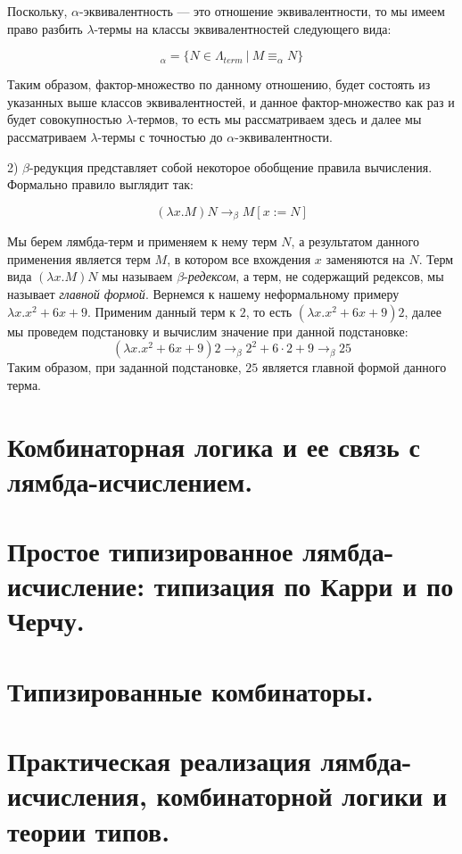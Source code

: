 \documentclass[a4paper]{article}
\begin{document}
Поскольку, $\alpha$-эквивалентность --- это отношение эквивалентности, то мы имеем право разбить $\lambda$-термы на классы эквивалентностей следующего вида:

\begin{equation}
[M]_{\alpha} = \{ N \in \Lambda_{term} \: | \: M \equiv_{\alpha} N \}
\end{equation}

Таким образом, фактор-множество по данному отношению, будет состоять из указанных выше классов эквивалентностей, и данное фактор-множество как
раз и будет совокупностью $\lambda$-термов, то есть мы рассматриваем здесь и далее мы рассматриваем $\lambda$-термы с точностью до $\alpha$-эквивалентности.

2) $\beta$-редукция представляет собой некоторое обобщение правила вычисления. Формально правило выглядит так:

\begin{equation}
(\lambda x. M) N \rightarrow_{\beta} M[x := N]
\end{equation}

Мы берем лямбда-терм и применяем к нему терм $N$, а результатом данного применения является терм $M$, в котором все вхождения $x$ заменяются на $N$.
Терм вида $(\lambda x. M) N$ мы называем $\beta$-\emph{редексом}, а терм, не содержащий редексов, мы называет \emph{главной формой}.
Вернемся к нашему неформальному примеру $\lambda x.x^2 + 6x + 9$. Применим данный терм к $2$, то есть $(\lambda x.x^2 + 6x + 9) 2$, далее мы проведем подстановку и вычислим значение
при данной подстановке:
\begin{equation}
(\lambda x.x^2 + 6x + 9) 2 \rightarrow_{\beta} 2^2 + 6 \cdot 2 + 9 \rightarrow_{\beta} 25
\end{equation}
Таким образом, при заданной подстановке, $25$ является главной формой данного терма.

\section{Комбинаторная логика и ее связь с лямбда-исчислением.}
\section{Простое типизированное лямбда-исчисление: типизация по Карри и по Черчу.}
\section{Типизированные комбинаторы.}
\section{Практическая реализация лямбда-исчисления, комбинаторной логики и теории типов.}
\end{document}
